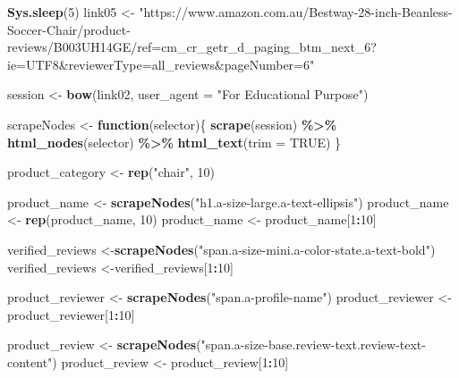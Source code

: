\documentclass[
]{article}
\newenvironment{Shaded}{\begin{snugshade}}{\end{snugshade}}
\newcommand{\AttributeTok}[1]{\textcolor[rgb]{0.13,0.29,0.53}{#1}}
\newcommand{\ConstantTok}[1]{\textcolor[rgb]{0.56,0.35,0.01}{#1}}
\newcommand{\ControlFlowTok}[1]{\textcolor[rgb]{0.13,0.29,0.53}{\textbf{#1}}}
\newcommand{\DecValTok}[1]{\textcolor[rgb]{0.00,0.00,0.81}{#1}}
\newcommand{\FunctionTok}[1]{\textcolor[rgb]{0.13,0.29,0.53}{\textbf{#1}}}
\newcommand{\NormalTok}[1]{#1}
\newcommand{\OtherTok}[1]{\textcolor[rgb]{0.56,0.35,0.01}{#1}}
\newcommand{\SpecialCharTok}[1]{\textcolor[rgb]{0.81,0.36,0.00}{\textbf{#1}}}
\newcommand{\StringTok}[1]{\textcolor[rgb]{0.31,0.60,0.02}{#1}}
\begin{document}
\begin{Shaded}
\begin{Highlighting}[]
   \FunctionTok{Sys.sleep}\NormalTok{(}\DecValTok{5}\NormalTok{)}
\NormalTok{link05 }\OtherTok{\textless{}{-}} \StringTok{"https://www.amazon.com.au/Bestway{-}28{-}inch{-}Beanless{-}Soccer{-}Chair/product{-}reviews/B003UH14GE/ref=cm\_cr\_getr\_d\_paging\_btm\_next\_6?ie=UTF8\&reviewerType=all\_reviews\&pageNumber=6"}


\NormalTok{  session }\OtherTok{\textless{}{-}} \FunctionTok{bow}\NormalTok{(link02,}
               \AttributeTok{user\_agent =} \StringTok{"For Educational Purpose"}\NormalTok{)}

\NormalTok{  scrapeNodes }\OtherTok{\textless{}{-}} \ControlFlowTok{function}\NormalTok{(selector)\{}
    \FunctionTok{scrape}\NormalTok{(session) }\SpecialCharTok{\%\textgreater{}\%}
      \FunctionTok{html\_nodes}\NormalTok{(selector) }\SpecialCharTok{\%\textgreater{}\%}
      \FunctionTok{html\_text}\NormalTok{(}\AttributeTok{trim =} \ConstantTok{TRUE}\NormalTok{)}
\NormalTok{  \}}

\NormalTok{  product\_category }\OtherTok{\textless{}{-}} \FunctionTok{rep}\NormalTok{(}\StringTok{"chair"}\NormalTok{, }\DecValTok{10}\NormalTok{)}

\NormalTok{  product\_name }\OtherTok{\textless{}{-}} \FunctionTok{scrapeNodes}\NormalTok{(}\StringTok{"h1.a{-}size{-}large.a{-}text{-}ellipsis"}\NormalTok{)}
\NormalTok{  product\_name }\OtherTok{\textless{}{-}} \FunctionTok{rep}\NormalTok{(product\_name, }\DecValTok{10}\NormalTok{)}
\NormalTok{  product\_name }\OtherTok{\textless{}{-}}\NormalTok{ product\_name[}\DecValTok{1}\SpecialCharTok{:}\DecValTok{10}\NormalTok{]}
  
\NormalTok{  verified\_reviews }\OtherTok{\textless{}{-}}\FunctionTok{scrapeNodes}\NormalTok{(}\StringTok{"span.a{-}size{-}mini.a{-}color{-}state.a{-}text{-}bold"}\NormalTok{)}
\NormalTok{  verified\_reviews }\OtherTok{\textless{}{-}}\NormalTok{verified\_reviews[}\DecValTok{1}\SpecialCharTok{:}\DecValTok{10}\NormalTok{]}
  
\NormalTok{  product\_reviewer }\OtherTok{\textless{}{-}} \FunctionTok{scrapeNodes}\NormalTok{(}\StringTok{"span.a{-}profile{-}name"}\NormalTok{)}
\NormalTok{  product\_reviewer }\OtherTok{\textless{}{-}}\NormalTok{ product\_reviewer[}\DecValTok{1}\SpecialCharTok{:}\DecValTok{10}\NormalTok{]}
  
\NormalTok{  product\_review }\OtherTok{\textless{}{-}} \FunctionTok{scrapeNodes}\NormalTok{(}\StringTok{"span.a{-}size{-}base.review{-}text.review{-}text{-}content"}\NormalTok{)}
\NormalTok{  product\_review }\OtherTok{\textless{}{-}}\NormalTok{ product\_review[}\DecValTok{1}\SpecialCharTok{:}\DecValTok{10}\NormalTok{]}
  

\end{Highlighting}
\end{Shaded}
\end{document}

